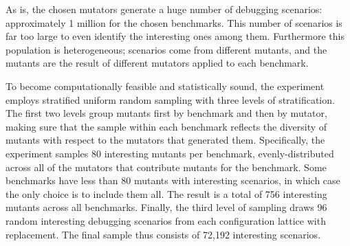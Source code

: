 

As is, the chosen mutators generate a huge number of debugging scenarios:
approximately 1 million for the chosen benchmarks. This number of scenarios is
far too large to even identify the interesting ones among them.  Furthermore
this population is heterogeneous; scenarios come from different
mutants, and the mutants are the result of different mutators applied to each
benchmark.

To become computationally feasible and statistically sound, the experiment employs
stratified uniform random sampling with three levels of stratification.
The first two levels group mutants first by benchmark and then by
mutator, making sure that the sample within each benchmark reflects the diversity of
mutants with respect to the mutators that generated them.  Specifically, the
experiment samples 80 interesting mutants per benchmark,
evenly-distributed across all of the mutators that contribute mutants for the
benchmark. Some benchmarks have less than  80 mutants with interesting scenarios,
in which case the only choice is to include them all.
The result is a total of 756 interesting mutants across all benchmarks.
Finally, the third level of sampling draws 96 random interesting debugging
scenarios from each configuration lattice with replacement. The
final sample thus consists of 72,192 interesting scenarios.



